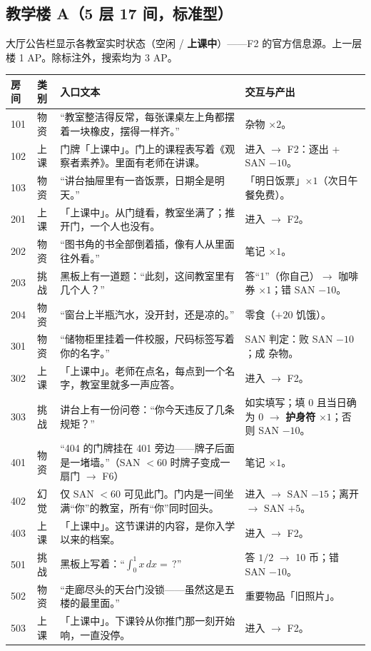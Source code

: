 \documentclass[UTF8, fontset=none, 11pt]{ctexart}
\begin{document}
\subsection{教学楼 A（5 层 17 间，标准型）}
大厅公告栏显示各教室实时状态（空闲 / \textbf{上课中}）——F2 的官方信息源。上一层楼 1 AP。除标注外，搜索均为 3 AP。
\begin{longtable}{p{1.1cm}p{1.2cm}p{6.6cm}p{5.5cm}}
\toprule
房间 & 类别 & 入口文本 & 交互与产出 \\
\midrule
\endhead
101 & 物资 & ``教室整洁得反常，每张课桌左上角都摆着一块橡皮，摆得一样齐。'' & 杂物 $\times 2$。 \\
102 & 上课 & 门牌「上课中」。门上的课程表写着《观察者素养》。里面有老师在讲课。 & 进入 $\to$ F2：逐出 + SAN $-10$。 \\
103 & 物资 & ``讲台抽屉里有一沓饭票，日期全是明天。'' & 「明日饭票」$\times 1$（次日午餐免费）。 \\
201 & 上课 & 「上课中」。从门缝看，教室坐满了；推开门，一个人也没有。 & 进入 $\to$ F2。 \\
202 & 物资 & ``图书角的书全部倒着插，像有人从里面往外看。'' & 笔记 $\times 1$。 \\
203 & 挑战 & 黑板上有一道题：``此刻，这间教室里有几个人？'' & 答``1''（你自己）$\to$ 咖啡券 $\times 1$；错 SAN $-10$。 \\
204 & 物资 & ``窗台上半瓶汽水，没开封，还是凉的。'' & 零食（$+20$ 饥饿）。 \\
301 & 物资 & ``储物柜里挂着一件校服，尺码标签写着你的名字。'' & SAN 判定：败 SAN $-10$；成 杂物。 \\
302 & 上课 & 「上课中」。老师在点名，每点到一个名字，教室里就多一声应答。 & 进入 $\to$ F2。 \\
303 & 挑战 & 讲台上有一份问卷：``你今天违反了几条规矩？'' & 如实填写；填 0 且当日确为 0 $\to$ \textbf{护身符} $\times 1$；否则 SAN $-10$。 \\
401 & 物资 & ``404 的门牌挂在 401 旁边——牌子后面是一堵墙。''（SAN $<60$ 时牌子变成一扇门 $\to$ F6） & 笔记 $\times 1$。 \\
402 & 幻觉 & 仅 SAN $<60$ 可见此门。门内是一间坐满``你''的教室，所有``你''同时回头。 & 进入 $\to$ SAN $-15$；离开 $\to$ SAN $+5$。 \\
403 & 上课 & 「上课中」。这节课讲的内容，是你入学以来的档案。 & 进入 $\to$ F2。 \\
501 & 挑战 & 黑板上写着：``$\int_0^1 x\,dx = \,?$'' & 答 $1/2$ $\to$ 10 币；错 SAN $-10$。 \\
502 & 物资 & ``走廊尽头的天台门没锁——虽然这是五楼的最里面。'' & 重要物品「旧照片」。 \\
503 & 上课 & 「上课中」。下课铃从你推门那一刻开始响，一直没停。 & 进入 $\to$ F2。 \\
\bottomrule
\end{longtable}
\end{document}
